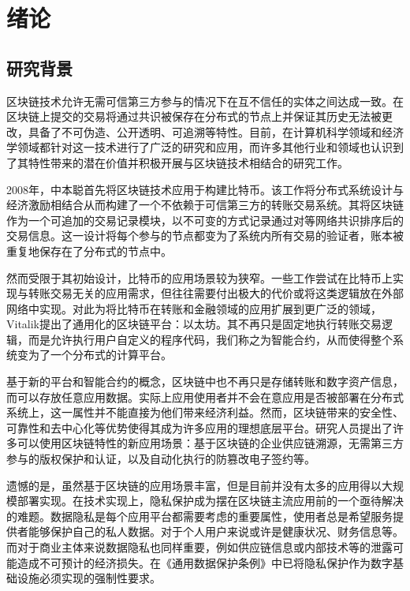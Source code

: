 \chapter{绪论}

\section{研究背景}
区块链技术允许无需可信第三方参与的情况下在互不信任的实体之间达成一致。在区块链上提交的交易将通过共识被保存在分布式的节点上并保证其历史无法被更改，具备了不可伪造、公开透明、可追溯等特性。目前，在计算机科学领域和经济学领域都针对这一技术进行了广泛的研究和应用，而许多其他行业和领域也认识到了其特性带来的潜在价值并积极开展与区块链技术相结合的研究工作。

2008年，中本聪首先将区块链技术应用于构建比特币\cite{bitcoin}。该工作将分布式系统设计与经济激励相结合从而构建了一个不依赖于可信第三方的转账交易系统。其将区块链作为一个可追加的交易记录模块，以不可变的方式记录通过对等网络共识排序后的交易信息。这一设计将每个参与的节点都变为了系统内所有交易的验证者，账本被重复地保存在了分布式的节点中。

然而受限于其初始设计，比特币的应用场景较为狭窄。一些工作\cite{Namecoin, coloredcoins}尝试在比特币上实现与转账交易无关的应用需求，但往往需要付出极大的代价或将这类逻辑放在外部网络中实现。对此为将比特币在转账和金融领域的应用扩展到更广泛的领域，Vitalik提出了通用化的区块链平台：以太坊\cite{Ethereum}。其不再只是固定地执行转账交易逻辑，而是允许执行用户自定义的程序代码，我们称之为智能合约，从而使得整个系统变为了一个分布式的计算平台。

基于新的平台和智能合约的概念，区块链中也不再只是存储转账和数字资产信息，而可以存放任意应用数据。实际上应用使用者并不会在意应用是否被部署在分布式系统上，这一属性并不能直接为他们带来经济利益。然而，区块链带来的安全性、可靠性和去中心化等优势使得其成为许多应用的理想底层平台。研究人员提出了许多可以使用区块链特性的新应用场景：基于区块链的企业供应链溯源\cite{zhang2020blockchain}，无需第三方参与的版权保护和认证\cite{savelyev2018copyright}，以及自动化执行的防篡改电子签约\cite{9380170}等。

遗憾的是，虽然基于区块链的应用场景丰富，但是目前并没有太多的应用得以大规模部署实现。在技术实现上，隐私保护成为摆在区块链主流应用前的一个亟待解决的难题。数据隐私是每个应用平台都需要考虑的重要属性，使用者总是希望服务提供者能够保护自己的私人数据。对于个人用户来说或许是健康状况、财务信息等。而对于商业主体来说数据隐私也同样重要，例如供应链信息或内部技术等的泄露可能造成不可预计的经济损失。在《通用数据保护条例》\cite{GDPR}中已将隐私保护作为数字基础设施必须实现的强制性要求。

